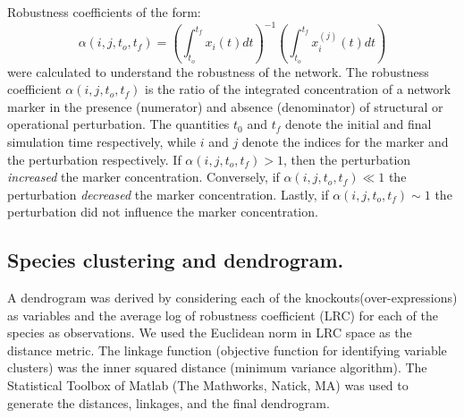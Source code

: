 \documentclass[fleqn,10pt]{wlscirep}
\begin{document}
Robustness coefficients of the form:
\begin{equation}
\alpha\left(i,j,t_{o},t_{f}\right)=\left(\displaystyle\int_{t_{o}}^{t_{f}}x_{i}\left(t\right)dt\right)^{-1}\left(\displaystyle\int_{t_{o}}^{t_{f}}x^{(j)}_{i}\left(t\right)dt\right)
\end{equation}
were calculated to understand the robustness of the network. 
The robustness coefficient $\alpha\left(i,j,t_{o},t_{f}\right)$ is the ratio of the integrated concentration of a network marker 
in the presence (numerator) and absence (denominator) of structural or operational perturbation.
The quantities $t_0$ and $t_f$ denote the initial and final simulation time respectively, while
$i$ and $j$ denote the indices for the marker and the perturbation respectively. 
If $\alpha\left(i,j,t_{o},t_{f}\right)>1$, then the perturbation \emph{increased} the marker concentration. Conversely,
if $\alpha\left(i,j,t_{o},t_{f}\right)\ll{1}$ the perturbation \emph{decreased} the marker concentration. Lastly, if
$\alpha\left(i,j,t_{o},t_{f}\right)\sim{1}$ the perturbation did not influence the marker concentration.

\subsection*{Species clustering and dendrogram.}
A dendrogram was derived by considering each of the knockouts(over-expressions) as variables and the average log of robustness coefficient (LRC) for each of the species as observations. We used the Euclidean norm in LRC space as the distance metric. The linkage function (objective function for identifying variable clusters) was the inner squared distance (minimum variance algorithm). The Statistical Toolbox of Matlab (The Mathworks, Natick, MA) was used to generate the distances, linkages, and the final dendrogram. 
\end{document}
